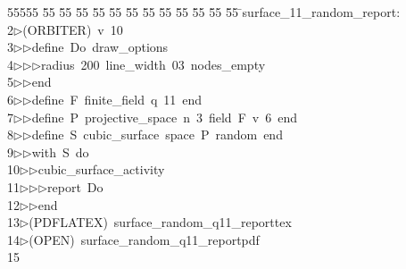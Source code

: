 %
%
\begin{tabbing}
55555 \= 55 \= 55 \= 55 \= 55 \= 55 \= 55 \= 55 \= 55 \= 55 \= 55 \= 55 \= 55 \= \>surface\_11\_random\_report:\\[0pt]
2\>$\triangleright$\>(ORBITER)\ v\ 10\ \\[0pt]
3\>$\triangleright$\>$\triangleright$\>define\ Do\ draw\_options\ \\[0pt]
4\>$\triangleright$\>$\triangleright$\>$\triangleright$\>radius\ 200\ line\_width\ 03\ nodes\_empty\ \\[0pt]
5\>$\triangleright$\>$\triangleright$\>end\ \\[0pt]
6\>$\triangleright$\>$\triangleright$\>define\ F\ finite\_field\ q\ 11\ end\ \\[0pt]
7\>$\triangleright$\>$\triangleright$\>define\ P\ projective\_space\ n\ 3\ field\ F\ v\ 6\ end\ \\[0pt]
8\>$\triangleright$\>$\triangleright$\>define\ S\ cubic\_surface\ space\ P\ random\ end\ \\[0pt]
9\>$\triangleright$\>$\triangleright$\>with\ S\ do\ \\[0pt]
10\>$\triangleright$\>$\triangleright$\>cubic\_surface\_activity\ \\[0pt]
11\>$\triangleright$\>$\triangleright$\>$\triangleright$\>report\ Do\ \\[0pt]
12\>$\triangleright$\>$\triangleright$\>end\\[0pt]
13\>$\triangleright$\>(PDFLATEX)\ surface\_random\_q11\_reporttex\\[0pt]
14\>$\triangleright$\>(OPEN)\ surface\_random\_q11\_reportpdf\\[0pt]
15\>\end{tabbing}
